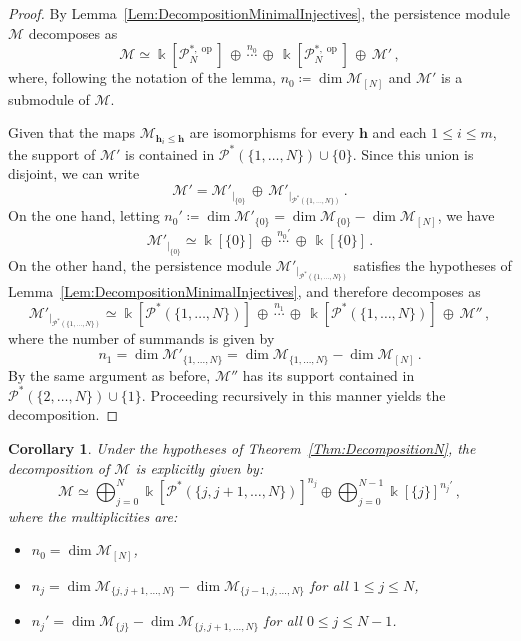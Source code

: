 \documentclass[reqno,12pt]{amsart}
\newcommand{\cM}{\mathcal{M}}
\newcommand{\cP}{\mathcal{P}}
\DeclareMathOperator{\op}{op}
\newcommand{\0}{\mathbf 0}
\newcommand{\h}{\mathbf{h}}
\newtheorem{corollary}[theorem]{Corollary}
\theoremstyle{definition}
\begin{document}
\begin{proof}
   By Lemma~\ref{Lem:DecompositionMinimalInjectives}, the persistence module $\cM$ decomposes as
    \[
    \cM\simeq \Bbbk[\cP^{*,\op}_N]\,\oplus\,\stackrel{n_0}\cdots\,\oplus\,\Bbbk[\cP^{*,\op}_N]\,\oplus\,\cM'\,,
    \]
    where, following the notation of the lemma, $n_0\coloneqq\dim \cM_{[N]}$ and $\cM'$ is a submodule of $\cM$.
    
    Given that the maps $\cM_{\h_i\leq\h}$ are isomorphisms for every $\h$ and each $1 \leq i \leq m$, the support of $\cM'$ is contained in $\cP^*(\{1,\dots,N\})\cup\{0\}$. Since this union is disjoint, we can write
    \[
\cM'={\cM'}_{|_{\{0\}}}\,\oplus\,{\cM'}_{|_{\cP^*(\{1,\dots,N\})}}\,.
\]
On the one hand, letting $n_0'\coloneqq \dim \cM'_{\{0\}}=\dim \cM_{\{0\}}-\dim \cM_{[N]}$, we have
\[
{\cM'}_{|_{\{0\}}}\simeq \Bbbk[\{0\}]\,\oplus\,\stackrel{n_0'}\cdots\,\oplus\,\Bbbk[\{0\}]\, .
\]
On the other hand, the persistence module $\cM'_{|_{\cP^*(\{1,\dots,N\})}}$ satisfies the hypotheses of Lemma~\ref{Lem:DecompositionMinimalInjectives}, and therefore decomposes as
\[
{\cM'}_{|_{\cP^*(\{1,\dots,N\})}}\simeq \Bbbk[\cP^*(\{1,\dots,N\})]\,\oplus\,\stackrel{n_1}\cdots\,\oplus\, \Bbbk[\cP^*(\{1,\dots,N\})]\,\oplus\,\cM'' \, ,
\]
where the number of summands is given by
\[
n_1=\dim \cM'_{\{1,\dots,N\}}=\dim \cM_{\{1,\dots,N\}}-\dim \cM_{[N]}\, .
\]
By the same argument as before, $\cM''$ has its support contained in $\cP^*(\{2,\dots,N\})\cup \{1\}$. Proceeding recursively in this manner yields the decomposition.
\end{proof}
\begin{corollary}\label{Cor:DecompositionN_Explicit}
    Under the hypotheses of Theorem~\ref{Thm:DecompositionN}, the decomposition of $\cM$ is explicitly given by:
    \[
        \cM\simeq \bigoplus_{j=0}^N  \Bbbk[\cP^*(\{j,j+1,\dots,N\})]^{n_j}\oplus \bigoplus_{j=0}^{N-1}\Bbbk[\{j\}]^{n_j'}\,,
    \]
    where the multiplicities are:
    \begin{itemize}
        \item $n_0=\dim\cM_{[N]}$,
        \item $n_j=\dim \cM_{\{j,j+1,\dots,N\}}-\dim\cM_{\{j-1,j,\dots,N\}}$ for all $1\leq j\leq N$,
        \item $n_j'=\dim \cM_{\{j\}}-\dim\cM_{\{j,j+1,\dots,N\}}$ for all $0\leq j\leq N-1$.
    \end{itemize}
\end{corollary}
\end{document}
